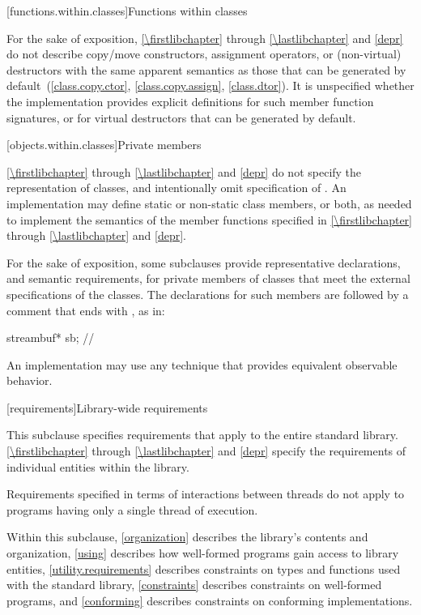 [functions.within.classes]{Functions within classes}

\pnum
For the sake of exposition, \ref{\firstlibchapter} through \ref{\lastlibchapter}
and \ref{depr} do not describe copy/move constructors, assignment
operators, or (non-virtual) destructors with the same apparent
semantics as those that can be generated
by default~(\ref{class.copy.ctor}, \ref{class.copy.assign}, \ref{class.dtor}).
%
%
%
It is unspecified whether
the implementation provides explicit definitions for such member function
signatures, or for virtual destructors that can be generated by default.

[objects.within.classes]{Private members}

\pnum
\ref{\firstlibchapter} through \ref{\lastlibchapter} and
\ref{depr} do not specify the representation of classes, and intentionally
omit specification of . An implementation may
define static or non-static class members, or both, as needed to implement the
semantics of the member functions specified in \ref{\firstlibchapter}
through \ref{\lastlibchapter} and \ref{depr}.

\pnum
For the sake of exposition,
some subclauses provide representative declarations, and semantic requirements, for
private members of classes that meet the external specifications of the classes.
The declarations for such members are
followed by a comment that ends with \expos, as in:

\begin{codeblock}
streambuf* sb;      // \expos
\end{codeblock}

\pnum
An implementation may use any technique that provides equivalent observable behavior.

[requirements]{Library-wide requirements}

\pnum
This subclause specifies requirements that apply to the entire \Cpp{} standard library.
\ref{\firstlibchapter} through \ref{\lastlibchapter} and \ref{depr}
specify the requirements of individual entities within the library.

\pnum
Requirements specified in terms of interactions between threads do not apply to
programs having only a single thread of execution.

\pnum
Within this subclause, \ref{organization} describes the library's contents and
organization, \ref{using} describes how well-formed \Cpp{} programs gain access to library
entities,
\ref{utility.requirements} describes constraints on types and functions used with
the \Cpp{} standard library,
\ref{constraints} describes constraints on well-formed \Cpp{} programs, and
\ref{conforming} describes constraints on conforming implementations.

